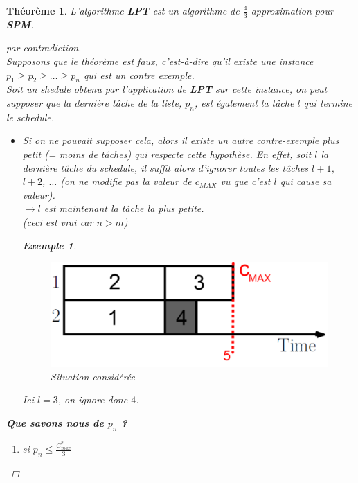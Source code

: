 \documentclass{article}
\newcommand{\titre}[1]{\textcolor{title}{#1}}
\newtheorem{exemple}{Exemple}[section]
\newtheorem{thm}{Th\'eor\`eme}[section]
\newtheorem{proof}{Preuve}[section]
\begin{document}
\begin{sffamily}
\begin{thm} L'algorithme \textbf{LPT} est un algorithme de $\frac 4 3$-approximation pour \textbf{\titre{SPM}}.
\begin{proof}[par contradiction]$ $\\
Supposons que le théorème est faux, c'est-à-dire qu'il existe une instance $p_1\geq p_2\geq \ldots \geq p_n$ qui est un contre exemple. \\
Soit un shedule obtenu par l'application de \textbf{LPT} sur cette instance, on peut supposer que la dernière tâche de la liste, $p_n$, est
également la tâche $l$ qui termine le schedule.
\begin{itemize}
\item[$\hookrightarrow$] Si on ne pouvait supposer cela, alors il existe un autre contre-exemple plus petit (= moins de tâches) qui
respecte cette hypothèse. En effet, soit $l$ la dernière tâche du schedule, il suffit alors d'ignorer toutes les tâches $l+1$, $l+2$,
$\ldots$ (on ne modifie pas la valeur de $c_{MAX}$ vu que c'est $l$ qui cause sa valeur).\\
	 $\rightarrow l$ est maintenant la tâche la plus petite. \\
	 \textit{(ceci est vrai car $n>m$)}
	 \begin{exemple}$ $
\begin{figure}[h!]
    \begin{center}
    \includegraphics[scale=0.3]{spm8.pdf}
    \caption{Situation considérée}
    \end{center}
\end{figure}
	Ici $l=3$, on ignore donc $4$.
	 \end{exemple}
\end{itemize}
\textbf{Que savons nous de $p_n$ ?}
\begin{enumerate}
\item[a)] si $p_n \leq \frac{C^*_{max}}{3}$


\end{enumerate}
\end{proof}
\end{thm}
\end{sffamily}
\end{document}
